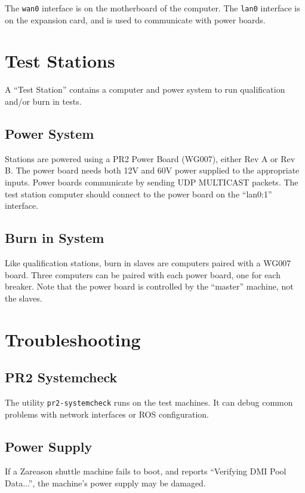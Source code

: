\documentclass[11pt]{report}
\begin{document}
The \texttt{wan0} interface is on the motherboard of the computer. The \texttt{lan0} interface is on the expansion card, and is used to communicate with power boards.

\section{Test Stations}

A ``Test Station'' contains a computer and power system to run qualification and/or burn in tests.

\subsection{Power System}

Stations are powered using a PR2 Power Board (WG007), either Rev A or Rev B. The power board needs both 12V and 60V power supplied to the appropriate inputs. Power boards communicate by sending UDP MULTICAST packets. The test station computer should connect to the power board on the ``lan0:1'' interface.

\subsection{Burn in System}

Like qualification stations, burn in slaves are computers paired with a WG007 board. Three computers can be paired with each power board, one for each breaker. Note that the power board is controlled by the ``master'' machine, not the slaves.

\section{Troubleshooting}

\subsection{PR2 Systemcheck}

The utility \texttt{pr2-systemcheck} runs on the test machines. It can debug common problems with network interfaces or ROS configuration.

\subsection{Power Supply}

If a Zareason shuttle machine fails to boot, and reports ``Verifying DMI Pool Data...'', the machine's power supply may be damaged. 
\end{document}
